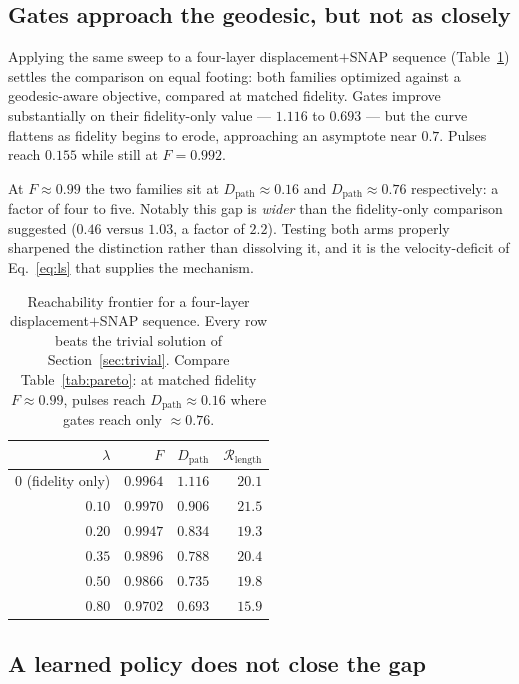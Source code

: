 \documentclass[10pt]{article}
\newcommand{\Dpath}{D_{\mathrm{path}}}
\newcommand{\Rlen}{\mathcal{R}_{\mathrm{length}}}
\begin{document}
\subsection{Gates approach the geodesic, but not as closely}
\label{sec:gatepareto}

Applying the same sweep to a four-layer displacement$+$SNAP sequence
(Table~\ref{tab:gatepareto}) settles the comparison on equal footing: both
families optimized against a geodesic-aware objective, compared at matched
fidelity. Gates improve substantially on their fidelity-only value --- $1.116$ to
$0.693$ --- but the curve flattens as fidelity begins to erode, approaching an
asymptote near $0.7$. Pulses reach $0.155$ while still at $F=0.992$.

At $F\approx0.99$ the two families sit at $\Dpath\approx0.16$ and
$\Dpath\approx0.76$ respectively: a factor of four to five. Notably this gap is
\emph{wider} than the fidelity-only comparison suggested ($0.46$ versus $1.03$, a
factor of $2.2$). Testing both arms properly sharpened the distinction rather than
dissolving it, and it is the velocity-deficit of Eq.~\eqref{eq:ls} that supplies
the mechanism.

\begin{table}[t]
\centering
\small
\begin{tabular}{@{}rrrr@{}}
\toprule
$\lambda$ & $F$ & $\Dpath$ & $\Rlen$ \\
\midrule
$0$ (fidelity only) & $0.9964$ & $1.116$ & $20.1$ \\
$0.10$ & $0.9970$ & $0.906$ & $21.5$ \\
$0.20$ & $0.9947$ & $0.834$ & $19.3$ \\
$0.35$ & $0.9896$ & $0.788$ & $20.4$ \\
$0.50$ & $0.9866$ & $0.735$ & $19.8$ \\
$0.80$ & $0.9702$ & $\mathbf{0.693}$ & $15.9$ \\
\bottomrule
\end{tabular}
\caption{Reachability frontier for a four-layer displacement$+$SNAP sequence.
Every row beats the trivial solution of Section~\ref{sec:trivial}. Compare
Table~\ref{tab:pareto}: at matched fidelity $F\approx0.99$, pulses reach
$\Dpath\approx0.16$ where gates reach only $\approx0.76$.}
\label{tab:gatepareto}
\end{table}

\subsection{A learned policy does not close the gap}
\end{document}
